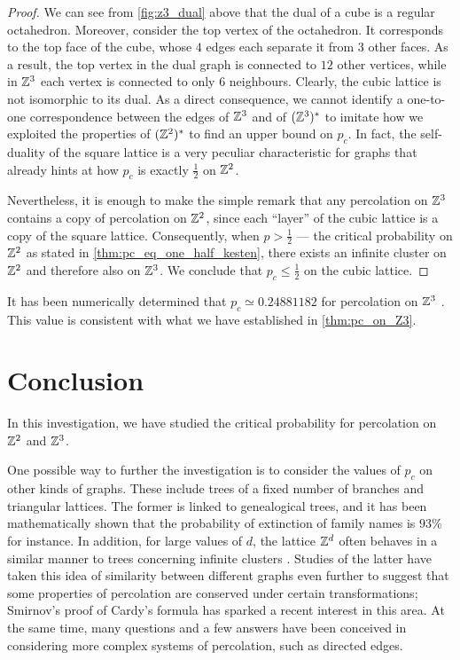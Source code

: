\documentclass[a4paper, 12pt]{article}
\begin{document}
\begin{proof}
We can see from \cref{fig:z3_dual} above that the dual of a cube is a regular octahedron. Moreover, consider the top vertex of the octahedron. It corresponds to the top face of the cube, whose $4$ edges each separate it from $3$ other faces. As a result, the top vertex in the dual graph is connected to $12$ other vertices, while in $\mathbb{Z}^3$ each vertex is connected to only $6$ neighbours. Clearly, the cubic lattice is not isomorphic to its dual. As a direct consequence, we cannot identify a one-to-one correspondence between the edges of $\mathbb{Z}^3$ and of $(\mathbb{Z}^3)^*$ to imitate how we exploited the properties of $(\mathbb{Z}^2)^*$ to find an upper bound on $p_c$. In fact, the self-duality of the square lattice is a very peculiar characteristic for graphs that already hints at how $p_c$ is exactly $\frac{1}{2}$ on $\mathbb{Z}^2$.

Nevertheless, it is enough to make the simple remark that any percolation on $\mathbb{Z}^3$ contains a copy of percolation on $\mathbb{Z}^2$, since each ``layer'' of the cubic lattice is a copy of the square lattice. Consequently, when $p > \frac{1}{2}$ --- the critical probability on $\mathbb{Z}^2$ as stated in \cref{thm:pc_eq_one_half_kesten}, there exists an infinite cluster on $\mathbb{Z}^2$  and therefore also on $\mathbb{Z}^3$. We conclude that $p_c \leq \frac{1}{2}$ on the cubic lattice.
\end{proof}

\begin{rem*}
It has been numerically determined that $p_c \simeq 0.24881182$ for percolation on $\mathbb{Z}^3$ \autocite[7]{zhou_2014}. This value is consistent with what we have established in \cref{thm:pc_on_Z3}.
\end{rem*}

\section{Conclusion}
In this investigation, we have studied the critical probability for percolation on $\mathbb{Z}^2$ and $\mathbb{Z}^3$.

One possible way to further the investigation is to consider the values of $p_c$ on other kinds of graphs. These include trees of a fixed number of branches and triangular lattices. The former is linked to genealogical trees, and it has been mathematically shown that the probability of extinction of family names is $93\%$ \autocite[]{gennes_2000} for instance. In addition, for large values of $d$, the lattice $\mathbb{Z}^d$ often behaves in a similar manner to trees concerning infinite clusters \autocite[]{gennes_2000}. Studies of the latter have taken this idea of similarity between different graphs even further to suggest that some properties of percolation are conserved under certain transformations; Smirnov's proof of Cardy's formula \autocite*[1]{smirnov_2001} has sparked a recent interest in this area. At the same time, many questions and a few answers have been conceived in considering more complex systems of percolation, such as directed edges.
\end{document}
